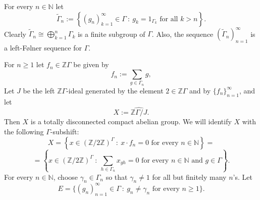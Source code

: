 \documentclass[oneside,english]{amsart}
\theoremstyle{definition}
\begin{document}
For every $n \in \mathbb{N}$ let
\begin{equation}
\tilde \Gamma_n := \left\{(g_n)_{k=1}^\infty \in \Gamma~:~ g_k =1_{\Gamma_k} \mbox{ for all } k > n \right\}.
\end{equation}
 Clearly   $\tilde \Gamma_n \cong \bigoplus_{k=1}^{n}\Gamma_k$ is a finite subgroup of $\Gamma$. %
 Also, the sequence $(\tilde \Gamma_n)_{n=1}^\infty$ is a left-F{\o}lner sequence for $\Gamma$.

For $n \ge 1$ let $f_n \in \mathbb{Z}\Gamma$ be given by
\begin{equation}
 f_n := \sum_{g \in \Gamma_n}g,
\end{equation}
Let $J$ be the left $\mathbb{Z}\Gamma$-ideal generated by the element $2 \in \mathbb{Z}\Gamma$ and by $\{f_n\}_{n=1}^\infty$,
and let
$$ X :=  \widehat{\mathbb{Z} \Gamma / J}.$$
Then $X$ is a totally disconnected compact abelian group.  We will identify $X$ with the following $\Gamma$-subshift:
$$ X = \left\{ x \in (\mathbb{Z}/2\mathbb{Z})^\Gamma ~:~ x\cdot f_n = 0 \mbox{ for every } n \in \mathbb{N} \right\}=$$
$$=\left\{ x \in (\mathbb{Z}/2\mathbb{Z})^\Gamma ~:~ \sum_{h \in \Gamma_n}x_{gh} =0 \mbox{ for every } n \in \mathbb{N} \mbox{ and } g \in \Gamma\right\}.$$
For every $n \in \mathbb{N}$, choose $\gamma_n \in \Gamma_n$ so that $\gamma_n \ne 1$ for all but finitely many $n$'s.
Let
\begin{equation}
E = \{ (g_n)_{n=1}^\infty \in \Gamma~:~ g_n \ne \gamma_n \mbox{ for every } n\ge 1\}.
\end{equation}
\end{document}

